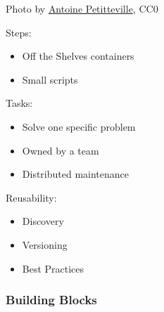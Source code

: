 \documentclass[aspectratio=169,11pt,hyperref={colorlinks=true}]{beamer}
\begin{document}
\begin{lpicrblack}{%
  Photo by \href{https://unsplash.com/@ant0ine}{\underline{Antoine Petitteville}}, CC0
  }%
  {%
    Steps:
    \begin{itemize}
      \item Off the Shelves containers
      \item Small scripts %
    \end{itemize}
    Tasks:
    \begin{itemize}
      \item Solve one specific problem
      \item Owned by a team
      \item Distributed maintenance
    \end{itemize}
    \vspace{0.05\paperheight}
    Reusability:
    \begin{itemize}
      \item Discovery
      \item Versioning
      \item Best Practices
    \end{itemize}
  }{}%
  \frametitle{Building Blocks}
\end{lpicrblack}

\end{document}
